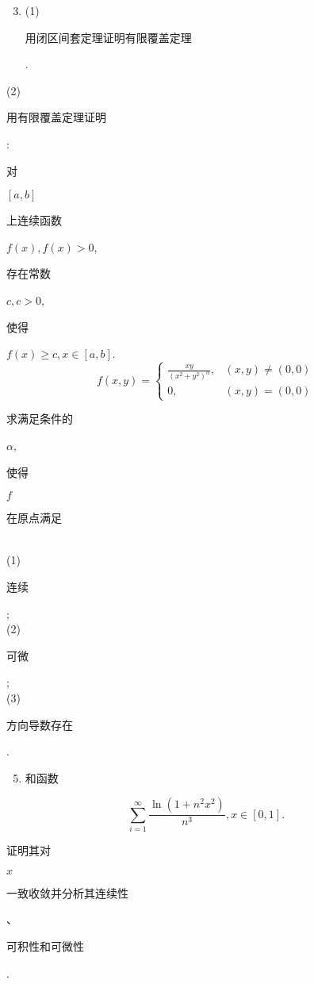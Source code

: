 \documentclass[10pt]{article}
\begin{document}
\begin{enumerate}
  \setcounter{enumi}{2}
  \item (1) \begin{CJK}{UTF8}{mj}用闭区间套定理证明有限覆盖定理\end{CJK}.
\end{enumerate}
(2) \begin{CJK}{UTF8}{mj}用有限覆盖定理证明\end{CJK}: \begin{CJK}{UTF8}{mj}对\end{CJK} $[a, b]$ \begin{CJK}{UTF8}{mj}上连续函数\end{CJK} $f(x), f(x)>0$, \begin{CJK}{UTF8}{mj}存在常数\end{CJK} $c, c>0$, \begin{CJK}{UTF8}{mj}使得\end{CJK} $f(x) \geqslant c, x \in[a, b]$.
$$
f(x, y)= \begin{cases}\frac{x y}{\left(x^{2}+y^{2}\right)^{\alpha}}, & (x, y) \neq(0,0) \\ 0, & (x, y)=(0,0)\end{cases}
$$
\begin{CJK}{UTF8}{mj}求满足条件的\end{CJK} $\alpha$, \begin{CJK}{UTF8}{mj}使得\end{CJK} $f$ \begin{CJK}{UTF8}{mj}在原点满足\end{CJK}\\
(1) \begin{CJK}{UTF8}{mj}连续\end{CJK};\\
(2) \begin{CJK}{UTF8}{mj}可微\end{CJK};\\
(3) \begin{CJK}{UTF8}{mj}方向导数存在\end{CJK}.

\begin{enumerate}
  \setcounter{enumi}{4}
  \item \begin{CJK}{UTF8}{mj}和函数\end{CJK}
\end{enumerate}
$$
\sum_{i=1}^{\infty} \frac{\ln \left(1+n^{2} x^{2}\right)}{n^{3}}, x \in[0,1] .
$$
\begin{CJK}{UTF8}{mj}证明其对\end{CJK} $x$ \begin{CJK}{UTF8}{mj}一致收敛并分析其连续性\end{CJK}、\begin{CJK}{UTF8}{mj}可积性和可微性\end{CJK}.
\end{document}
